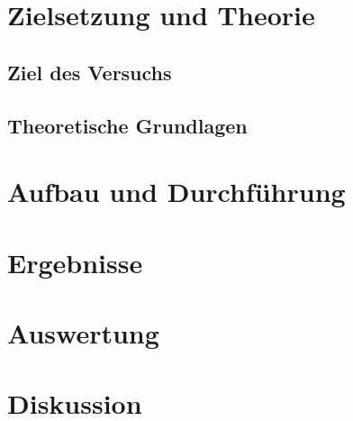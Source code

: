 





\maketitle
\tableofcontents
\newpage

\section{Zielsetzung und Theorie}

\subsection{Ziel des Versuchs}


\subsection{Theoretische Grundlagen}


\section{Aufbau und Durchführung}


\section{Ergebnisse}


\section{Auswertung}


\section{Diskussion}


\newpage
\nocite{*}
\printbibliography


